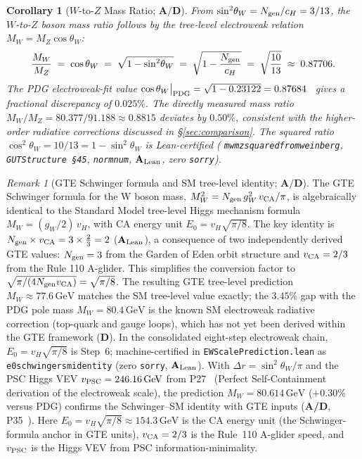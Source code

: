 \documentclass[11pt]{article}
\newtheorem{corollary}[theorem]{Corollary}
\theoremstyle{remark}
\newtheorem{remark}[theorem]{Remark}
\newcommand{\Ngen}{N_{\rm gen}}
\newcommand{\cH}{c_H}
\newcommand{\lean}[1]{%
  \penalty-100
  \begingroup\def\_{\textunderscore\allowbreak}\texttt{#1}\endgroup}
\newcommand{\sinwsq}{\sin^2\!\theta_W}
\newcommand{\CatAL}{\ensuremath{\textbf{A}_{\rm Lean}}}
\newcommand{\CatAD}{\textbf{A/D}}
\newcommand{\CatD}{\textbf{D}}
\begin{document}
\begin{corollary}[$W$-to-$Z$ Mass Ratio; $\CatAD$]
\label{cor:mw_mz}
From $\sinwsq = \Ngen/\cH = 3/13$, the $W$-to-$Z$ boson mass ratio follows
by the tree-level electroweak relation $M_W = M_Z\cos\theta_W$:
\begin{equation}
  \frac{M_W}{M_Z}
  \;=\; \cos\theta_W
  \;=\; \sqrt{1-\sinwsq}
  \;=\; \sqrt{1 - \frac{\Ngen}{\cH}}
  \;=\; \sqrt{\frac{10}{13}}
  \;\approx\; 0.87706.
\label{eq:mw_mz}
\end{equation}
The PDG electroweak-fit value
$\cos\theta_W\big|_{\rm PDG} = \sqrt{1 - 0.23122} = 0.87684$~\cite{ParticleDataGroup2022}
gives a fractional discrepancy of $0.025\%$.
The directly measured mass ratio $M_W/M_Z = 80.377/91.188 \approx 0.8815$
deviates by $0.50\%$, consistent with the higher-order radiative corrections
discussed in \S\ref{sec:comparison}.
The squared ratio
$\cos^2\!\theta_W = 10/13 = 1 - \sinwsq$
is Lean-certified
(\lean{mw\_mz\_squared\_from\_weinberg}, \texttt{GUTStructure~\S45},
\lean{norm\_num}, $\CatAL$, zero \texttt{sorry}).
\end{corollary}

\begin{remark}[GTE Schwinger formula and SM tree-level identity; $\CatAD$]
\label{rem:schwinger_sm_identity}
The GTE Schwinger formula for the W boson mass,
$M_W^2 = \Ngen\,g_W^2\,v_{\rm CA}/\pi$,
is algebraically identical to the Standard Model tree-level Higgs mechanism formula
$M_W = (g_W/2)\,v_H$, with CA energy unit
$E_0 = v_H\sqrt{\pi/8}$.
The key identity is $\Ngen \times v_{\rm CA} = 3\times\tfrac{2}{3} = 2$
($\CatAL$), a consequence of two independently derived GTE values:
$\Ngen = 3$ from the Garden of Eden orbit structure and
$v_{\rm CA} = 2/3$ from the Rule 110 A-glider.
This simplifies the conversion factor to $\sqrt{\pi/(4\Ngen v_{\rm CA})} = \sqrt{\pi/8}$.
The resulting GTE tree-level prediction $M_W \approx 77.6\,\text{GeV}$ matches the
SM tree-level value exactly; the $3.45\%$ gap with the PDG pole mass
$M_W = 80.4\,\text{GeV}$ is the known SM electroweak radiative correction
(top-quark and gauge loops), which has not yet been derived within the GTE framework
($\CatD$).
In the consolidated eight-step electroweak chain, $E_0 = v_H\sqrt{\pi/8}$ is Step~6;
machine-certified in \lean{EWScalePrediction.lean} as
\lean{e0\_schwinger\_sm\_identity} (zero \texttt{sorry}, $\CatAL$).
With $\Delta r = \sinwsq/\pi$ and the PSC Higgs VEV $v_{\rm PSC} = 246.16\,\text{GeV}$ from P27~\cite{SpivackSRRG} (Perfect Self-Containment derivation of the electroweak scale), the
prediction $M_W = 80.614\,\text{GeV}$ ($+0.30\%$ versus PDG) confirms the
Schwinger--SM identity with GTE inputs (\CatAD, P35~\cite{SpivackGTEUnification}).
Here $E_0 = v_H\sqrt{\pi/8} \approx 154.3\,\text{GeV}$ is the CA energy unit (the Schwinger-formula anchor in GTE units), $v_{\rm CA} = 2/3$ is the Rule~110 A-glider speed, and $v_{\rm PSC}$ is the Higgs VEV from PSC information-minimality.
\end{remark}
\end{document}
